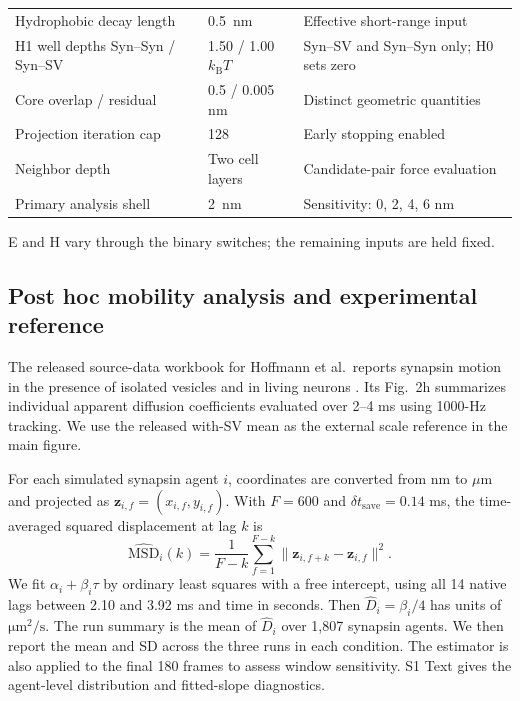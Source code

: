 \documentclass[11pt,letterpaper]{article}
\newcommand{\kBT}{k_{\mathrm B}T}
\begin{document}
\begin{table}[htbp]
\begin{tabularx}{\linewidth}{@{}l l Y@{}}
Hydrophobic decay length & \SI{0.5}{\nano\metre} & Effective short-range input \\
H1 well depths Syn--Syn / Syn--SV & 1.50 / 1.00 $\kBT$ & Syn--SV and Syn--Syn only; H0 sets zero \\
Core overlap / residual & 0.5 / 0.005 nm & Distinct geometric quantities \\
Projection iteration cap & 128 & Early stopping enabled \\
Neighbor depth & Two cell layers & Candidate-pair force evaluation \\
Primary analysis shell & \SI{2}{\nano\metre} & Sensitivity: 0, 2, 4, 6 nm \\
\bottomrule
\end{tabularx}
\par\smallskip\raggedright
E and H vary through the binary switches; the remaining inputs are held fixed.
\end{table}

\subsection{Post hoc mobility analysis and experimental reference}
The released source-data workbook for Hoffmann et al.\ reports
synapsin motion in the presence of isolated vesicles and in living neurons
\cite{Hoffmann2023}. Its Fig.~2h summarizes individual apparent diffusion
coefficients evaluated over 2--4 ms using 1000-Hz tracking. We use the
released with-SV mean as the external scale reference in the main figure.

For each simulated synapsin agent $i$, coordinates are converted from nm
to $\mu$m and projected as $\bm z_{i,f}=(x_{i,f},y_{i,f})$. With $F=600$
and $\delta t_{\mathrm{save}}=0.14$ ms, the time-averaged squared
displacement at lag $k$ is
\begin{equation}
 \widehat{\mathrm{MSD}}_i(k)=\frac{1}{F-k}
    \sum_{f=1}^{F-k}\|\bm z_{i,f+k}-\bm z_{i,f}\|^2 .
 \label{eq:posthoc-msd}
\end{equation}
We fit $\alpha_i+\beta_i\tau$ by ordinary least squares with a free
intercept, using all 14 native lags between 2.10 and 3.92 ms and time
in seconds. Then $\widehat D_i=\beta_i/4$ has units of
$\si{\micro\metre\squared\per\second}$. The run summary is the mean
of $\widehat D_i$ over 1,807 synapsin agents. We then report the mean and
SD across the three runs in each condition. The estimator is also applied
to the final 180 frames to assess window sensitivity. S1 Text gives the
agent-level distribution and fitted-slope diagnostics.
\end{document}
